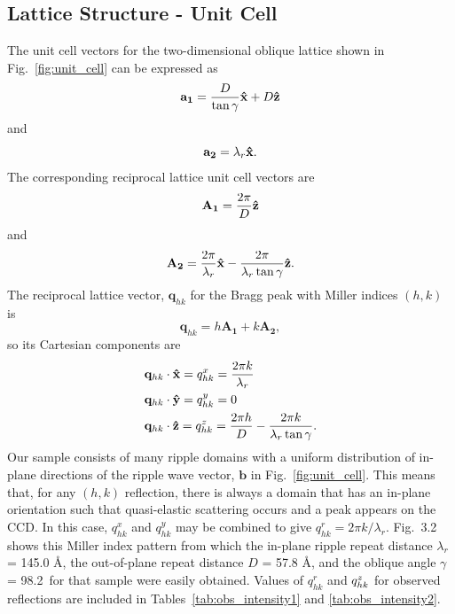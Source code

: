 \subsection{Lattice Structure - Unit Cell}\label{sec:lattice_structure}
The unit cell vectors for the two-dimensional oblique lattice shown in Fig.~\ref{fig:unit_cell}
can be expressed as 
\begin{equation}
  \mathbf{a_1} = \frac{D}{\tan\gamma}\mathbf{\hat{x}} + D\mathbf{\hat{z}}
\end{equation}
and
\begin{equation}
  \mathbf{a_2} = \lambda_r\mathbf{\hat{x}}.
\end{equation}
The corresponding reciprocal lattice unit cell vectors are
\begin{equation}
  \mathbf{A_1} = \frac{2\pi}{D}\mathbf{\hat{z}}
\end{equation}
and
\begin{equation}
  \mathbf{A_2} = \frac{2\pi}{\lambda_r}\mathbf{\hat{x}} - \frac{2\pi}{\lambda_r\tan\gamma}\mathbf{\hat{z}}.
\end{equation}
The reciprocal lattice vector, $\mathbf{q}_{hk}$ for the Bragg peak with 
Miller indices $(h,k)$ is 
\begin{equation}
  \mathbf{q}_{hk}=h\mathbf{A_1}+k\mathbf{A_2},
\end{equation}
so its Cartesian components are
\begin{align}
  & \mathbf{q}_{hk}\cdot\mathbf{\hat{x}} = q_{hk}^x = \frac{2\pi k}{\lambda_r}\\
  & \mathbf{q}_{hk}\cdot\mathbf{\hat{y}} = q_{hk}^y = 0 \\
  & \mathbf{q}_{hk}\cdot\mathbf{\hat{z}} = q_{hk}^z = \frac{2\pi h}{D} - \frac{2\pi k}{\lambda_r\tan\gamma}.
\end{align}
Our sample consists of many ripple domains with a uniform distribution of 
in-plane directions of the
ripple wave vector, $\mathbf{b}$ in Fig.~\ref{fig:unit_cell}. 
This means that, for any $(h,k)$ reflection, there is always a domain that has 
an in-plane orientation such that quasi-elastic scattering occurs and a peak 
appears on the CCD.  
In this case, $q_{hk}^x$ and $q_{hk}^y$ may be combined to 
give $q_{hk}^r = 2\pi k/\lambda_r$.  
Fig.~3.2 shows this Miller index pattern from which the in-plane ripple repeat 
distance $\lambda_r$ = 145.0 \AA, the out-of-plane repeat distance 
$D$ = 57.8 \AA, and the oblique angle $\gamma$ = 98.2\textdegree\ for that 
sample were easily obtained.
Values of $q_{hk}^r$ and $q_{hk}^z$ for observed reflections are included
in Tables~\ref{tab:obs_intensity1} and \ref{tab:obs_intensity2}.

